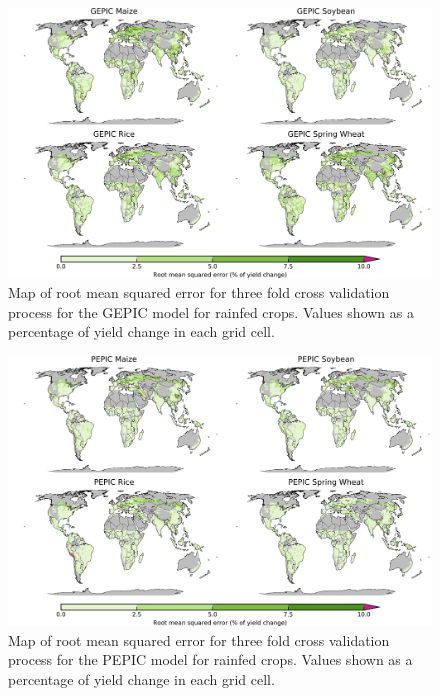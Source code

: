 \documentclass[12pt]{article}
\begin{document}
\begin{figure}[h!]
  \centering
  \includegraphics[width=15.5cm]{GEPIC_spatial_MSE_ton_ha.png}
  \caption{Map of root mean squared error for three fold cross validation process for the GEPIC model for rainfed crops. Values shown as a percentage of yield change in each grid cell.}
\end{figure}

\begin{figure}[h!]
  \centering
  \includegraphics[width=15.5cm]{PEPIC_spatial_MSE_ton_ha.png}
  \caption{Map of root mean squared error for three fold cross validation process for the PEPIC model for rainfed crops. Values shown as a percentage of yield change in each grid cell.}
\end{figure}


\printbibliography
%
\end{document}
